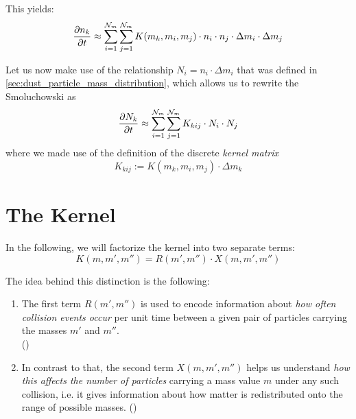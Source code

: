         This yields:
        \begin{equation}
            \label{eq:discrete_smoluchowski_equation}
            \frac{\partial n_k}{\partial t}
                \approx \sum_{i=1}^{\mathcal N_m}\sum_{j=1}^{\mathcal N_m}
                    K(m_k,m_i,m_j)\cdot n_i\cdot n_j\cdot\Delta m_i\cdot\Delta m_j
        \end{equation}
    
        Let us now make use of the relationship $N_i=n_i \cdot \Delta m_i$ that was defined in 
        \cref{sec:dust_particle_mass_distribution}, which allows us to rewrite the Smoluchowski as
        \begin{equation}
            \frac{\partial N_k}{\partial t}
                \approx \sum_{i=1}^{\mathcal N_m}\sum_{j=1}^{\mathcal N_m} K_{kij}\cdot N_i\cdot N_j
        \end{equation}
        where we made use of the definition of the discrete \textit{kernel matrix}
        \begin{equation}
            K_{kij} := K(m_k,m_i,m_j) \cdot \Delta m_k
        \end{equation}
    
\section{The Kernel}

    In the following, we will factorize the kernel into two separate terms:
    \begin{equation}
        K(m,m',m'') = R(m',m'') \cdot X(m,m',m'') 
    \end{equation}

    The idea behind this distinction is the following: 
    \begin{enumerate}
        \item The first term $R(m',m'')$ is used to encode information about 
            \textit{how often collision events occur} per unit time between a given
            pair of particles carrying the masses $m'$ and $m''$. \\
            ()
        \item In contrast to that, the second term $X(m,m',m'')$ helps us understand 
            \textit{how this affects the number of particles} carrying a mass value $m$ under any
            such collision, i.e. it gives information about how matter is redistributed onto the
            range of possible masses.
            ()
    \end{enumerate}

